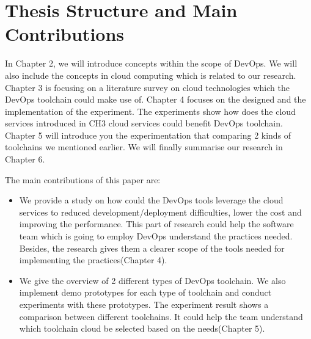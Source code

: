 \section{Thesis Structure and Main Contributions}
In Chapter 2, we will introduce concepts within the scope of DevOps. We will also include the concepts in cloud computing which is related to our research. Chapter 3 is focusing on a literature survey on cloud technologies which the DevOps toolchain could make use of. Chapter 4 focuses on the designed and the implementation of the experiment. The experiments show how does the cloud services introduced in CH3 cloud services could benefit DevOps toolchain. Chapter 5 will introduce you the experimentation that comparing 2 kinds of toolchains we mentioned earlier. We will finally summarise our research in Chapter 6.
\par
The main contributions of this paper are:
\begin{itemize}
    \item We provide a study on how could the DevOps tools leverage the cloud services to reduced development/deployment difficulties, lower the cost and improving the performance. This part of research could help the software team which is going to employ DevOps understand the practices needed. Besides, the research gives them a clearer scope of the tools needed for implementing the practices(Chapter 4).
    \item We give the overview of 2 different types of DevOps toolchain. We also implement demo prototypes for each type of toolchain and conduct experiments with these prototypes. The experiment result shows a comparison between different toolchains. It could help the team understand which toolchain cloud be selected based on the needs(Chapter 5).
\end{itemize}
